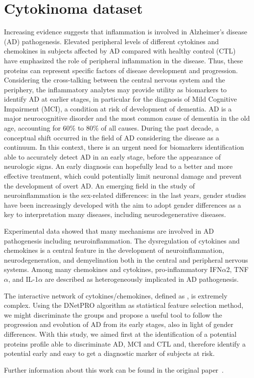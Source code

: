 \documentclass{standalone}
\begin{document}
\section[Cytokinoma Dataset]{Cytokinoma dataset}\label{cytokine:cytokine}

Increasing evidence suggests that inflammation is involved in Alzheimer's disease (AD) pathogenesis.
Elevated peripheral levels of different cytokines and chemokines in subjects affected by AD compared with healthy control (CTL) have emphasized the role of peripheral inflammation in the disease.
Thus, these proteins can represent specific factors of disease development and progression.
Considering the cross-talking between the central nervous system and the periphery, the inflammatory analytes may provide utility as biomarkers to identify AD at earlier stages, in particular for the diagnosis of Mild Cognitive Impairment (MCI), a condition at risk of development of dementia.
AD is a major neurocognitive disorder and the most common cause of dementia in the old age, accounting for 60\% to 80\% of all causes.
During the past decade, a conceptual shift occurred in the field of AD considering the disease as a continuum.
In this context, there is an urgent need for biomarkers identification able to accurately detect AD in an early stage, before the appearance of neurologic signs.
An early diagnosis can hopefully lead to a better and more effective treatment, which could potentially limit neuronal damage and prevent the development of overt AD.
An emerging field in the study of neuroinflammation is the sex-related differences: in the last years, gender studies have been increasingly developed with the aim to adopt gender differences as a key to interpretation many diseases, including neurodegenerative diseases.

Experimental data showed that many mechanisms are involved in AD pathogenesis including neuroinflammation.
The dysregulation of cytokines and chemokines is a central feature in the development of neuroinflammation, neurodegeneration, and demyelination both in the central and peripheral nervous systems.
Among many chemokines and cytokines, pro-inflammatory IFN$\alpha$2, TNF$\alpha$, and IL-1$\alpha$ are described as heterogeneously implicated in AD pathogenesis.

The interactive network of cytokines/chemokines, defined as , is extremely complex.
Using the \textsf{DNetPRO} algorithm as statistical feature selection method, we might discriminate the groups and propose a useful tool to follow the progression and evolution of AD from its early stages, also in light of gender differences.
With this study, we aimed first at the identification of a potential proteins profile able to discriminate AD, MCI and CTL and, therefore identify a potential early and easy to get a diagnostic marker of subjects at risk.

Further information about this work can be found in the original paper~\cite{Boccardi2019}.
\end{document}
